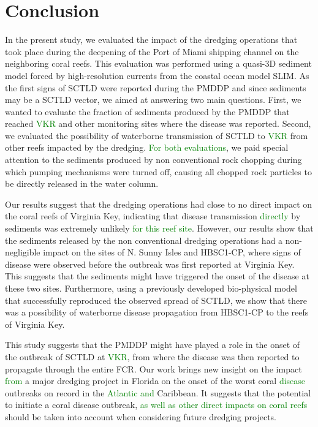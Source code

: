 \documentclass[preprint,12pt,authoryear]{elsarticle}
\newcommand{\modif}[1]{\textcolor{green}{#1}}
\begin{document}
\section{Conclusion}

In the present study, we evaluated the impact of the dredging operations that took place during the deepening of the Port of Miami shipping channel on the neighboring coral reefs. This evaluation was performed using a quasi-3D sediment model forced by high-resolution currents from the coastal ocean model SLIM. As the first signs of SCTLD were reported during the PMDDP and since sediments may be a SCTLD vector, we aimed at answering two main questions. First, we wanted to evaluate the fraction of sediments produced by the PMDDP that reached \modif{VKR} and other monitoring sites where the disease was reported. Second, we evaluated the possibility of waterborne transmission of SCTLD to \modif{VKR} from other reefs impacted by the dredging. \modif{For both evaluations}, we paid special attention to the sediments produced by non conventional rock chopping during which pumping mechanisms were turned off, causing all chopped rock particles to be directly released in the water column.

Our results suggest that the dredging operations had close to no direct impact on the coral reefs of Virginia Key, indicating that disease transmission \modif{directly} by sediments was extremely unlikely \modif{for this reef site}. However, our results show that the sediments released by the non conventional dredging operations had a non-negligible impact on the sites of N. Sunny Isles and HBSC1-CP, where signs of disease were observed before the outbreak was first reported at Virginia Key. This suggests that the sediments might have triggered the onset of the disease at these two sites. Furthermore, using a previously developed bio-physical model that successfully reproduced the observed spread of SCTLD, we show that there was a possibility of waterborne disease propagation from HBSC1-CP to the reefs of Virginia Key.

This study suggests that the PMDDP might have played a role in the onset of the outbreak of SCTLD at \modif{VKR}, from where the disease was then reported to propagate through the entire FCR. Our work brings new insight on the impact \modif{from} a major dredging project in Florida on the onset of the worst coral \modif{disease} outbreaks on record in the \modif{Atlantic and} Caribbean. It suggests that the potential to initiate a coral disease outbreak, \modif{as well as other direct impacts on coral reefs} should be taken into account when considering future dredging projects.
\end{document}
